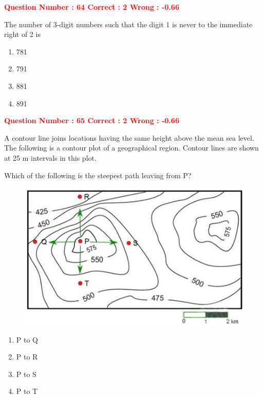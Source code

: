 \documentclass[12pt]{article}
\begin{document}
{\vspace{1em}


\textcolor{red}{\textbf{Question Number : 64 \hfill Correct : 2  Wrong : -0.66}}

\vspace{0.5em}

The number of 3-digit numbers such that the digit 1 is never to the immediate right of 2 is

\begin{enumerate}[label=(\Alph*)]
    \item 781
    \item 791
    \item 881
    \item 891
\end{enumerate}

\vspace{1em}

\newpage

\textcolor{red}{\textbf{Question Number : 65 \hfill Correct : 2  Wrong : -0.66}}

\vspace{1em}


A contour line joins locations having the same height above the mean sea level. The following is a contour plot of a geographical region. Contour lines are shown at 25 m intervals in this plot.

Which of the following is the steepest path leaving from P?

\begin{figure}[hbtp!]
    \centering
    \includegraphics[width=0.7\linewidth]{Figs/Graph_Q65.png}
\end{figure}

\begin{enumerate}[label=(\Alph*)]
    \item P to Q
    \item P to R
    \item P to S
    \item P to T
\end{enumerate}

}
\end{document}
